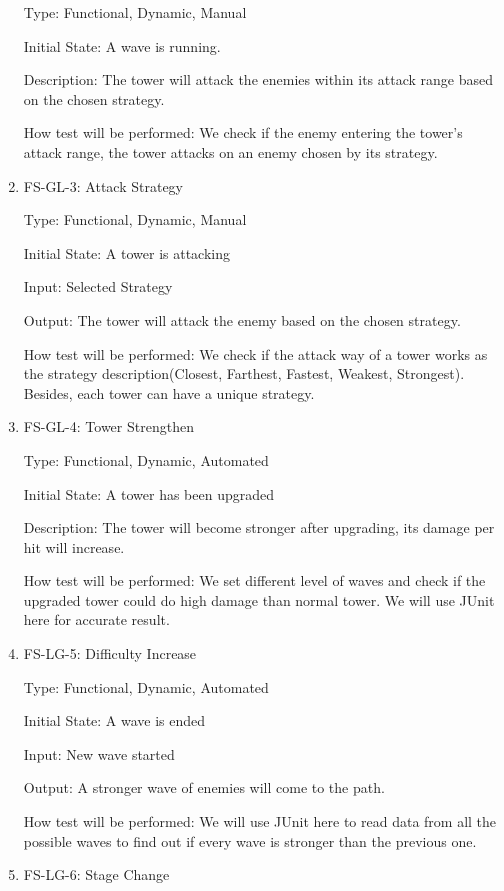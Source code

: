 \documentclass[12pt]{article}
\begin{document}
\begin{enumerate}
	Type: Functional, Dynamic, Manual
					
    Initial State: A wave is running.
					
	Description: The tower will attack the enemies within its attack range based on the chosen strategy.
					
	How test will be performed: We check if the enemy entering the tower's attack range, the tower attacks on an enemy chosen by its strategy.
					
	\item{FS-GL-3: Attack Strategy}
					
    Type: Functional, Dynamic, Manual
					
	Initial State: A tower is attacking
					
	Input: Selected Strategy
					
	Output: The tower will attack the enemy based on the chosen strategy.
					
	How test will be performed: We check if the attack way of a tower works as the strategy description(Closest, Farthest, Fastest, Weakest, Strongest). Besides, each tower can have a unique strategy.
	
	\item{FS-GL-4: Tower Strengthen}
	
	Type: Functional, Dynamic, Automated
	
	Initial State: A tower has been upgraded
	
	Description: The tower will become stronger after upgrading, its damage per hit will increase.
	
	How test will be performed: We set different level of waves and check if the upgraded tower could do high damage than normal tower. We will use JUnit here for accurate result.
	
	\item{FS-LG-5: Difficulty Increase}
	
	Type: Functional, Dynamic, Automated
	
	Initial State: A wave is ended
	
	Input: New wave started
	
	Output: A stronger wave of enemies will come to the path.
	
	How test will be performed: We will use JUnit here to read data from all the possible waves to find out if every wave is stronger than the previous one.

    \item{FS-LG-6: Stage Change}
	

\end{enumerate}
\end{document}

